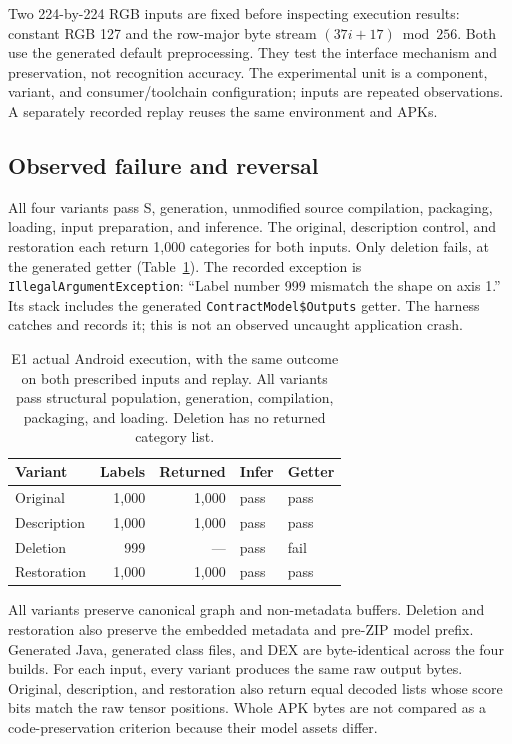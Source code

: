 \documentclass[10pt,twocolumn,letterpaper]{article}
\newcommand{\code}[1]{\texttt{#1}}
\begin{document}
Two 224-by-224 RGB inputs are fixed before inspecting execution results: constant RGB 127 and the row-major byte stream $(37i+17)\bmod256$. Both use the generated default preprocessing. They test the interface mechanism and preservation, not recognition accuracy. The experimental unit is a component, variant, and consumer/toolchain configuration; inputs are repeated observations. A separately recorded replay reuses the same environment and APKs.

\subsection{Observed failure and reversal}
All four variants pass S, generation, unmodified source compilation, packaging, loading, input preparation, and inference. The original, description control, and restoration each return 1,000 categories for both inputs. Only deletion fails, at the generated getter (Table~\ref{tab:e1}). The recorded exception is \code{IllegalArgumentException}: ``Label number 999 mismatch the shape on axis 1.'' Its stack includes the generated \code{ContractModel\$Outputs} getter. The harness catches and records it; this is not an observed uncaught application crash.

\begin{table}[t]
\centering\small
\setlength{\tabcolsep}{4pt}
\begin{tabular}{@{}lrrll@{}}
\toprule
Variant & Labels & Returned & Infer & Getter\\
\midrule
Original & 1,000 & 1,000 & pass & pass\\
Description & 1,000 & 1,000 & pass & pass\\
Deletion & 999 & --- & pass & fail\\
Restoration & 1,000 & 1,000 & pass & pass\\
\bottomrule
\end{tabular}
\caption{E1 actual Android execution, with the same outcome on both prescribed inputs and replay. All variants pass structural population, generation, compilation, packaging, and loading. Deletion has no returned category list.}
\label{tab:e1}
\end{table}

All variants preserve canonical graph and non-metadata buffers. Deletion and restoration also preserve the embedded metadata and pre-ZIP model prefix. Generated Java, generated class files, and DEX are byte-identical across the four builds. For each input, every variant produces the same raw output bytes. Original, description, and restoration also return equal decoded lists whose score bits match the raw tensor positions. Whole APK bytes are not compared as a code-preservation criterion because their model assets differ.
\end{document}
